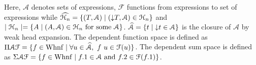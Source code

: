 \documentclass[a4paper,english]{lipics-utf8x}
\begin{document}
  \noindent %
  Here, $\mathcal{A}$ denotes sets of expressions, $\mathcal{F}$ functions from
  expressions to set of expressions while
  $\widehat{\mathcal{H}_n} = \{ (T,\mathcal{A}) \mid ({\downarrow} T, \mathcal{A}) \in \mathcal{H}_n \}$
  and $\mid \mathcal{H}_n \mid = \{ A \mid (A, \mathcal{A}) \in \mathcal{H}_n \text{ for some }
  \mathcal{A} \}$.
  $\widehat{\mathcal{A}} = \{ t \mid {\downarrow} t \in \mathcal{A} \}$ is the closure
  of $\mathcal{A}$ by weak head expansion.
  The dependent function space is defined as
  $\Pi \mathcal{A} \mathcal{F} = \{ f \in \operatorname{Whnf} \mid \forall u \in
  \widehat{\mathcal{A}},\ f~u \in \mathcal{F}(u) \}$.
  The dependent sum space is defined as
  $\Sigma \mathcal{A} \mathcal{F} = \{ f \in \operatorname{Whnf} \mid f.1 \in \mathcal{A}
  \text{ and } f.2 \in \mathcal{F}(f.1) \}$.
\end{document}
